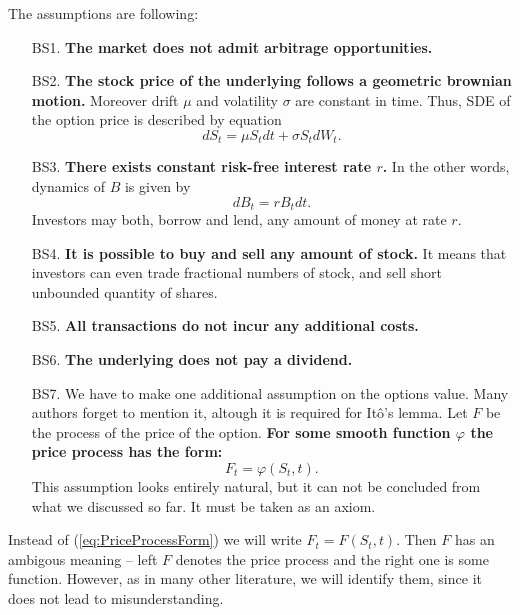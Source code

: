 \documentclass[a4paper,12pt, oneside]{book}
\theoremstyle{definition}
\theoremstyle{remark}
\begin{document}
The assumptions are following:
\begin{enumerate}
  \item[BS1.] \textbf{The market does not admit arbitrage opportunities.}

 \item[BS2.] \textbf{The stock price of the underlying follows a geometric brownian motion.} Moreover drift $\mu$ and volatility $\sigma$ are constant in time. Thus, SDE of the option price is described by equation
\begin{equation}
 \label{eq:BS_dynamics}
 dS_t = \mu S_t dt + \sigma S_t dW_t. 
\end{equation}
 
  \item[BS3.] \textbf{There exists constant risk-free interest rate $r$.} In the other words, dynamics of $B$ is given by 
\[ dB_t = rB_t dt. \]
Investors may both, borrow and lend, any amount of money at rate $r$.

  \item[BS4.] \textbf{It is possible to buy and sell any amount of stock.} It means that investors can even trade fractional numbers of stock, and sell short unbounded quantity of shares.

  \item[BS5.] \textbf{All transactions do not incur any additional costs.}

  \item[BS6.] \textbf{The underlying does not pay a dividend.}
  
  \item[BS7.] We have to make one additional assumption on the options value. Many authors forget to mention it, altough it is required for It\^{o}'s lemma. Let $F$ be the process of the price of the option\footnotemark.
  \textbf{For some smooth function $\varphi$ the price process has the form:}
    \begin{equation}
    \label{eq:PriceProcessForm}
    F_t = \varphi(S_t, t).
    \end{equation}
This assumption looks entirely natural, but it can not be concluded from what we discussed so far. It must be taken as an axiom.
\end{enumerate}

Instead of (\ref{eq:PriceProcessForm}) we will write $F_t = F(S_t, t)$. Then $F$ has an ambigous meaning -- left $F$ denotes the price process and the right one is some function. However, as in many other literature, we will identify them, since it does not lead to misunderstanding.
\end{document}
